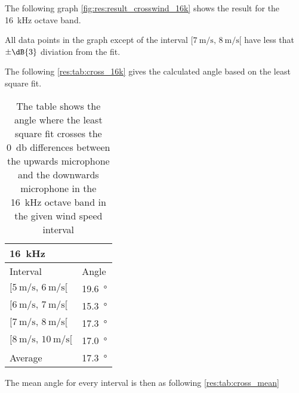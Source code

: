  The following graph \autoref{fig:res:result_crosswind_16k} shows the result for the \SI{16}{\kilo\hertz} octave band. 
 

 All data points in the graph except of the interval    $[\SI{7}{\meter\per\second},\, \SI{8}{\meter\per\second}[ $  have less that $\pm \dB{3}$ diviation from the fit.
 
 The following \autoref{res:tab:cross_16k} gives the calculated angle based on the least square fit.  
  
 \begin{table}[H]
 \centering
  \caption{The table shows the angle where the least square fit crosses the \SI{0}{\decibel} differences between the upwards microphone and the downwards microphone in the \SI{16}{\kilo\hertz} octave band in the given wind speed interval}
\begin{tabular}{l|l}
\multicolumn{2}{l}{\SI{16}{\kilo\hertz}}      \\ \hline
Interval & Angle \\ \hline
  $[\SI{5}{\meter\per\second},\, \SI{6}{\meter\per\second}[ $       &   \SI{19.6}{\degree}    \\
    $[\SI{6}{\meter\per\second},\, \SI{7}{\meter\per\second}[ $     &   \SI{15.3}{\degree}     \\
  $[\SI{7}{\meter\per\second},\, \SI{8}{\meter\per\second}[ $       &    \SI{17.3}{\degree}    \\
   $[\SI{8}{\meter\per\second},\, \SI{10}{\meter\per\second}[ $      &     \SI{17.0}{\degree}  \\ \hline
    Average      &     \SI{17.3}{\degree} 
\end{tabular}
\label{res:tab:cross_16k}
\end{table}    
 
 
The mean angle for every interval is then as following \autoref{res:tab:cross_mean}

